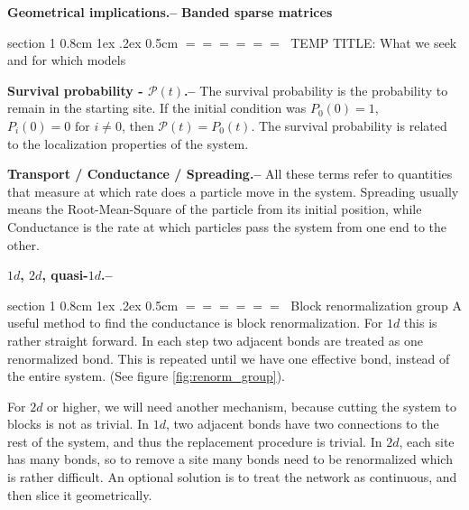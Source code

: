 \documentclass[onecolumn,fleqn,notitlepage,secnumarabic]{revtex4}
\makeatletter
\def\section{%
  \@startsection
    {section}%
    {1}%
    {\z@}%
    {0.8cm \@plus1ex \@minus .2ex}%
    {0.5cm}%
    {\Large\bf $=\!=\!=\!=\!=\!=\;$}%
}%
\makeatother
\begin{document}

{ \bf Geometrical implications.--} 
{ \bf Banded sparse matrices}

\section{TEMP TITLE: What we seek and for which models}


{ \bf Survival probability - $\mathcal{P}(t)$.--} 
The survival probability is the probability to remain in the starting site. If the initial condition was $P_0(0)=1$, $P_i(0)=0 \textrm{  for  } i\neq 0$, then $\mathcal{P}(t)= P_0(t)$. The survival probability is related to the localization properties of the system.

{ \bf Transport / Conductance / Spreading.--}
All these terms refer to quantities that measure at which rate does a particle move in the system. Spreading usually means the Root-Mean-Square of the particle from its initial position, while Conductance is the rate at which particles pass the system from one end to the other.

{ \bf $1d$, $2d$, quasi-$1d$.--}

\section{Block renormalization group}
A useful method to find the conductance is block renormalization. For $1d$ this is rather straight forward. In each step two adjacent bonds are treated as one renormalized bond. This is repeated until we have one effective bond, instead of the entire system. (See figure \ref{fig:renorm_group}). 


For $2d$ or higher, we will need another mechanism, because cutting the system to blocks is not as trivial. In $1d$, two adjacent bonds have two connections to the rest of the system, and thus the replacement procedure is trivial. In $2d$, each site has many bonds, so to remove a site many bonds need to be renormalized which is rather difficult. An optional solution is to treat the network as continuous, and then slice it geometrically.
\end{document}
